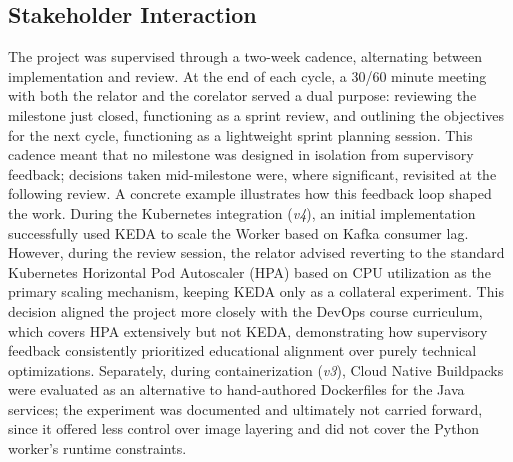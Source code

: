 \documentclass[twoside]{supsistudent}
\begin{document}
\subsection{Stakeholder Interaction}
The project was supervised through a two-week cadence, alternating between implementation and review. At the end of each cycle, a 30/60 minute meeting with both the relator and the corelator served a dual purpose: reviewing the milestone just closed, functioning as a sprint review, and outlining the objectives for the next cycle, functioning as a lightweight sprint planning session. This cadence meant that no milestone was designed in isolation from supervisory feedback; decisions taken mid-milestone were, where significant, revisited at the following review.
A concrete example illustrates how this feedback loop shaped the work. During the Kubernetes integration (\emph{v4}), an initial implementation successfully used KEDA to scale the Worker based on Kafka consumer lag. However, during the review session, the relator advised reverting to the standard Kubernetes Horizontal Pod Autoscaler (HPA) based on CPU utilization as the primary scaling mechanism, keeping KEDA only as a collateral experiment. This decision aligned the project more closely with the DevOps course curriculum, which covers HPA extensively but not KEDA, demonstrating how supervisory feedback consistently prioritized educational alignment over purely technical optimizations. Separately, during containerization (\emph{v3}), Cloud Native Buildpacks were evaluated as an alternative to hand-authored Dockerfiles for the Java services; the experiment was documented and ultimately not carried forward, since it offered less control over image layering and did not cover the Python worker's runtime constraints.
\end{document}

